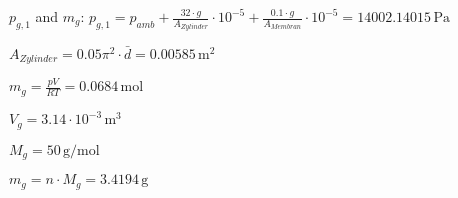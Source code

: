 \( p_{g,1} \) and \( m_g \):  
\( p_{g,1} = p_{amb} + \frac{32 \cdot g}{A_{Zylinder}} \cdot 10^{-5} + \frac{0.1 \cdot g}{A_{Membran}} \cdot 10^{-5} = 14002.14015 \, \text{Pa} \)  

\( A_{Zylinder} = 0.05 \pi^2 \cdot \bar{d} = 0.00585 \, \text{m}^2 \)  

\( m_g = \frac{p V}{R T} = 0.0684 \, \text{mol} \)  

\( V_g = 3.14 \cdot 10^{-3} \, \text{m}^3 \)  

\( M_g = 50 \, \text{g/mol} \)  

\( m_g = n \cdot M_g = 3.4194 \, \text{g} \)